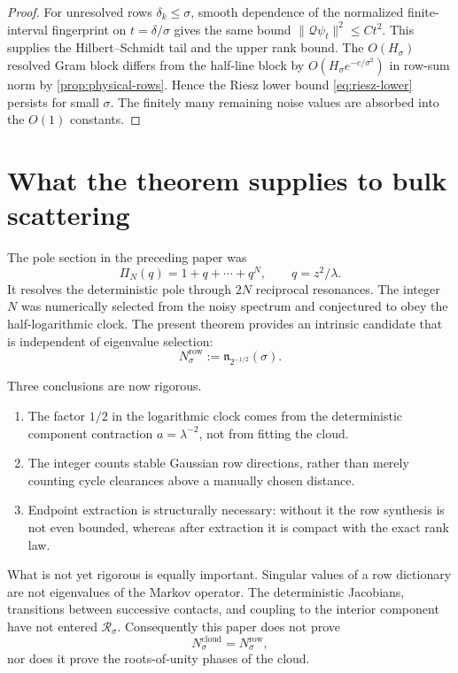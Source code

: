 \documentclass[11pt]{article}
\theoremstyle{definition}
\theoremstyle{remark}
\newcommand{\cR}{\mathcal R}
\newcommand{\cQ}{\mathcal Q}
\begin{document}
\begin{proof}
For unresolved rows $\delta_k\le\sigma$, smooth dependence of the normalized
finite-interval fingerprint on $t=\delta/\sigma$ gives the same bound
$\|\cQ\psi_t\|^2\le Ct^2$.  This supplies the Hilbert--Schmidt tail and the
upper rank bound.  The $O(H_\sigma)$ resolved Gram block differs from the
half-line block by $O(H_\sigma e^{-c/\sigma^2})$ in row-sum norm by
\cref{prop:physical-rows}.  Hence the Riesz lower bound
\eqref{eq:riesz-lower} persists for small $\sigma$.  The finitely many
remaining noise values are absorbed into the $O(1)$ constants.
\end{proof}

\section{What the theorem supplies to bulk scattering}
\label{sec:bulk-bridge}

The pole section in the preceding paper was
\begin{equation}\label{eq:pole-section}
 \Pi_N(q)=1+q+\cdots+q^N,
 \qquad q=z^2/\lambda.
\end{equation}
It resolves the deterministic pole through $2N$ reciprocal resonances.  The
integer $N$ was numerically selected from the noisy spectrum and conjectured
to obey the half-logarithmic clock.  The present theorem provides an intrinsic
candidate that is independent of eigenvalue selection:
\begin{equation}\label{eq:intrinsic-degree}
 N_\sigma^{\mathrm{row}}
 :=\mathfrak n_{2^{-1/2}}(\sigma).
\end{equation}

Three conclusions are now rigorous.
\begin{enumerate}[label=(\roman*),leftmargin=2.5em]
 \item The factor $1/2$ in the logarithmic clock comes from the deterministic
 component contraction $a=\lambda^{-2}$, not from fitting the cloud.
 \item The integer counts stable Gaussian row directions, rather than merely
 counting cycle clearances above a manually chosen distance.
 \item Endpoint extraction is structurally necessary: without it the row
 synthesis is not even bounded, whereas after extraction it is compact with
 the exact rank law.
\end{enumerate}

What is not yet rigorous is equally important.  Singular values of a row
dictionary are not eigenvalues of the Markov operator.  The deterministic
Jacobians, transitions between successive contacts, and coupling to the
interior component have not entered $\cR_\sigma$.  Consequently this paper
does not prove
\begin{equation}\label{eq:not-proved}
 N_\sigma^{\mathrm{cloud}}
 =N_\sigma^{\mathrm{row}},
\end{equation}
nor does it prove the roots-of-unity phases of the cloud.
\end{document}

